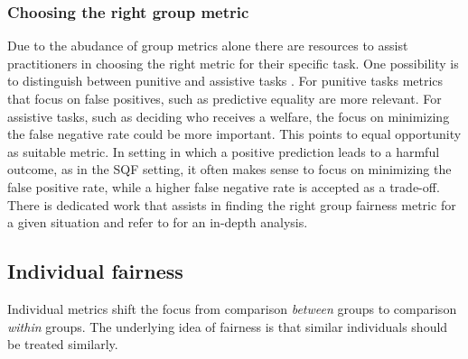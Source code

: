 \subsubsection*{Choosing the right group metric}

Due to the abudance of group metrics alone there are resources to assist practitioners in choosing the right metric for their specific task. One possibility is to distinguish between punitive and assistive tasks \cite{lane}. For punitive tasks metrics that focus on false positives, such as predictive equality are more relevant. For assistive tasks, such as deciding who receives a welfare, the focus on minimizing the false negative rate could be more important. This points to equal opportunity as suitable metric.
In setting in which a positive prediction leads to a harmful outcome, as in the SQF setting, it often makes sense to focus on minimizing the false positive rate, while a higher false negative rate is accepted as a trade-off.
There is dedicated work that assists in finding the right group fairness metric for a given situation and refer to \cite{makhlouf2021} for an in-depth analysis.

\subsection{Individual fairness}
Individual metrics shift the focus from comparison \textit{between} groups to comparison \textit{within} groups. The underlying idea of fairness is that similar individuals should be treated similarly.

